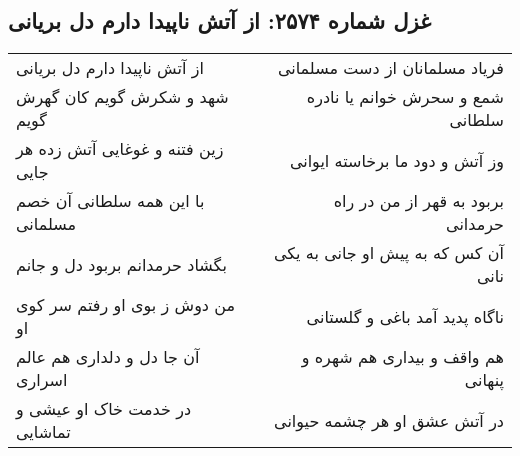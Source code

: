 \begin{center}
\section*{غزل شماره ۲۵۷۴: از آتش ناپیدا دارم دل بریانی}
\label{sec:2574}
\begin{longtable}{l p{0.5cm} r}
از آتش ناپیدا دارم دل بریانی
&&
فریاد مسلمانان از دست مسلمانی
\\
شهد و شکرش گویم کان گهرش گویم
&&
شمع و سحرش خوانم یا نادره سلطانی
\\
زین فتنه و غوغایی آتش زده هر جایی
&&
وز آتش و دود ما برخاسته ایوانی
\\
با این همه سلطانی آن خصم مسلمانی
&&
بربود به قهر از من در راه حرمدانی
\\
بگشاد حرمدانم بربود دل و جانم
&&
آن کس که به پیش او جانی به یکی نانی
\\
من دوش ز بوی او رفتم سر کوی او
&&
ناگاه پدید آمد باغی و گلستانی
\\
آن جا دل و دلداری هم عالم اسراری
&&
هم واقف و بیداری هم شهره و پنهانی
\\
در خدمت خاک او عیشی و تماشایی
&&
در آتش عشق او هر چشمه حیوانی
\\
\end{longtable}
\end{center}
